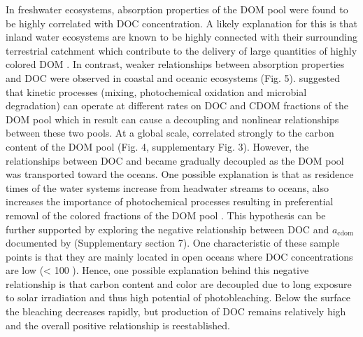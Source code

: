 In freshwater ecosystems, absorption properties of the DOM pool were found to be highly correlated with DOC concentration. A likely explanation for this is that inland water ecosystems are known to be highly connected with their surrounding terrestrial catchment \citep{Wiens2002, Frenette2012} which contribute to the delivery of large quantities  of highly colored DOM \citep{Massicotte2011EA, Lambert2016, Cole2007}. In contrast, weaker relationships between absorption properties and DOC were observed in coastal and oceanic ecosystems (Fig. 5). \citet{Stedmon2015b} suggested that kinetic processes (mixing, photochemical oxidation and microbial degradation) can operate at different rates on DOC and CDOM fractions of the DOM pool which in result can cause a decoupling and nonlinear relationships between these two pools. At a global scale,  correlated strongly to the carbon content of the DOM pool (Fig. 4, supplementary Fig. 3). However, the relationships between DOC and  became gradually decoupled as the DOM pool was transported toward the oceans. One possible explanation is that as residence times of the water systems increase from headwater streams to oceans,  also increases the importance of photochemical processes resulting in preferential removal of the colored fractions of the DOM pool \citep{Vahatalo2004, Moran2000, Bittar2015, Hansen2016, Weyhenmeyer2012}. This hypothesis can be further supported by exploring the negative relationship between DOC and $a_{\text{cdom}}$ documented by \citet{Nelson2013} (Supplementary section 7). One characteristic of these sample points is that they are mainly located in open oceans where DOC concentrations are low (< 100 \mmol).  Hence, one possible explanation behind this negative relationship is that carbon content and color are decoupled due to long exposure to solar irradiation and thus high potential of photobleaching. Below the surface the bleaching decreases rapidly, but production of DOC remains relatively high and the overall positive relationship is reestablished.

